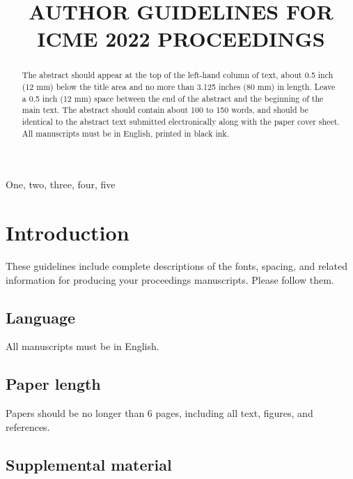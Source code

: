 \documentclass{article}
\begin{document}
\sloppy

\def\x{{\mathbf x}}
\def\L{{\cal L}}


\title{AUTHOR GUIDELINES FOR ICME 2022 PROCEEDINGS}
%
\address{}


\maketitle


%
\begin{abstract}
The abstract should appear at the top of the left-hand column of text, about 0.5 inch (12 mm) below the title area and no more than 3.125 inches (80 mm) in length.  Leave a 0.5 inch (12 mm) space between the end of the abstract and the beginning of the main text.  The abstract should contain about 100 to 150 words, and should be identical to the abstract text submitted electronically along with the paper cover sheet.  All manuscripts must be in English, printed in black ink.
\end{abstract}
%
\begin{keywords}
One, two, three, four, five
\end{keywords}
%
\section{Introduction}
\label{sec:intro}

These guidelines include complete descriptions of the fonts, spacing, and related information for producing your proceedings manuscripts. Please follow them. 

\subsection{Language}

All manuscripts must be in English.

\subsection{Paper length}

Papers should be no longer than 6 pages, including all text, figures, and references.

\subsection{Supplemental material}
\end{document}
